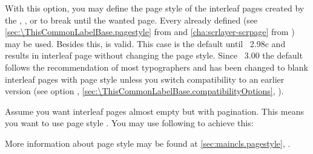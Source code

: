 \begin{Declaration}
\end{Declaration}%
With this option, %
you may define the page style of the interleaf pages created by the
,
, or
 to break until the wanted
page. Every already defined  (see
\autoref{sec:\ThisCommonLabelBase.pagestyle} from
 and
\autoref{cha:scrlayer-scrpage} from ) may be
used. Besides this,  is valid. This case
is the default until \KOMAScript~2.98c and results in interleaf page without
changing the page style. Since \KOMAScript~3.00%
the default follows the recommendation of most typographers and has been
changed to blank interleaf pages with page style  unless you
switch compatibility to an earlier version (see option
,
\autoref{sec:\ThisCommonLabelBase.compatibilityOptions},
).
\IfThisCommonLabelBase{maincls}{\iftrue}{\csname iffalse\endcsname}
  \begin{Example}
    Assume you want interleaf pages almost empty but with pagination. This
    means you want to use page style . You may use following
    to achieve this:
\begin{lstcode}
\end{lstcode}
    More information about page style  may be found at
    \autoref{sec:maincls.pagestyle},
    .
  \end{Example}
\else
  \IfThisCommonLabelBase{scrextend}{\iftrue}{\csname iffalse\endcsname}
    \begin{Example}
      \phantomsection\xmpllabel{option.cleardoublepage}%
      Assume you want interleaf pages almost empty but with pagination. This
      means you want to use page style \PageStyle{plain}. You may use
      following to achieve this:
\begin{lstcode}
  \KOMAoptions{cleardoublepage=plain}
\end{lstcode}
      More information about page style \PageStyle{plain} may be found at
      \autoref{sec:maincls.pagestyle},
      \DescPageRef{maincls.pagestyle.plain}.
    \end{Example}%
  \fi%
\fi%
\EndIndexGroup


